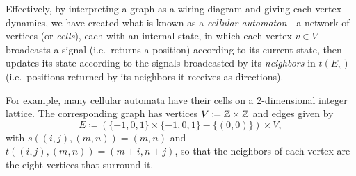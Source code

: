 \documentclass[Book-Poly]{subfiles}
\begin{document}
\begin{example}
Effectively, by interpreting a graph as a wiring diagram and giving each vertex dynamics, we have created what is known as a \emph{cellular automaton}---a network of vertices (or \emph{cells}), each with an internal state, in which each vertex $v\in V$ broadcasts a signal (i.e.\ returns a position) according to its current state, then updates its state according to the signals broadcasted by its \emph{neighbors} in $t(E_v)$ (i.e.\ positions returned by its neighbors it receives as directions).

For example, many cellular automata have their cells on a 2-dimensional integer lattice.
The corresponding graph has vertices $V\coloneqq\mathbb{Z}\times\mathbb{Z}$ and edges given by
\[
  E\coloneqq(\{-1,0,1\}\times\{-1,0,1\}-\{(0,0)\})\times V,
\]
with $s((i,j),(m,n))=(m,n)$ and $t((i,j),(m,n))=(m+i,n+j)$, so that the neighbors of each vertex are the eight vertices that surround it.
\end{example}
\end{document}
